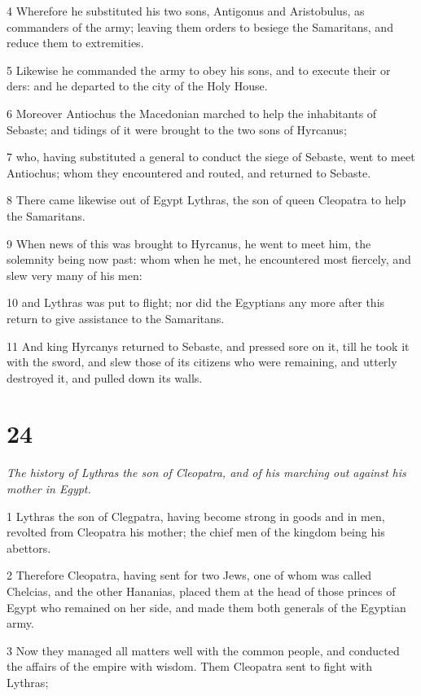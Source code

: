 4 Wherefore he substituted his two sons, Antigonus and Aristobulus, as commanders of the army; leaving them orders to besiege the Samaritans, and reduce them to extremities. 

5 Likewise he commanded the army to obey his sons, and to execute their or ders: and he departed to the city of the Holy House.

6 Moreover Antiochus the Macedonian marched to help the inhabitants of Sebaste; and tidings of it were brought to the two sons of Hyrcanus; 

7 who, having substituted a general to conduct the siege of Sebaste, went to meet Antiochus; whom they encountered and routed, and returned to Sebaste. 

8 There came likewise out of Egypt Lythras, the son of queen Cleopatra to help the Samaritans. 

9 When news of this was brought to Hyrcanus, he went to meet him, the solemnity being now past: whom when he met, he encountered most fiercely, and slew very many of his men:

10 and Lythras was put to flight; nor did the Egyptians any more after this return to give assistance to the Samaritans. 

11 And king Hyrcanys returned to Sebaste, and pressed sore on it, till he took it with the sword, and slew those of its citizens who were remaining, and utterly destroyed it, and pulled down its walls. 

\chapter{24}

\par \textit{The history of Lythras the son of Cleopatra, and of his marching out against his mother in Egypt.}

1 Lythras the son of Clegpatra, having become strong in goods and in men, revolted from Cleopatra his mother; the chief men of the kingdom being his abettors. 

2 Therefore Cleopatra, having sent for two Jews, one of whom was called Chelcias, and the other Hananias, placed them at the head of those princes of Egypt who remained on her side, and made them both generals of the Egyptian army. 

3 Now they managed all matters well with the common people, and conducted the affairs of the empire with wisdom. Them Cleopatra sent to fight with Lythras; 

